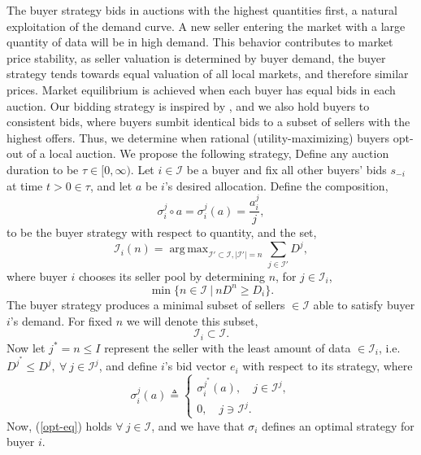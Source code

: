 \documentclass[12pt]{article}
\theoremstyle{definition}
\newcommand{\mcI}{\mathcal{I}}
\newcommand{\g}{\sigma}
\DeclareMathOperator*{\argmax}{arg\,max}
\begin{document}
\begin{multicols}{2}
The buyer strategy bids in auctions with the highest quantities first,
a natural exploitation of the demand curve. A new seller entering the market
with a large quantity of data will be in high demand. This behavior contributes to market price
stability, as seller valuation is determined by buyer demand, the
buyer strategy tends towards equal valuation of all local markets, and therefore
similar prices. Market equilibrium is achieved when each buyer has equal bids in
each auction. Our bidding strategy is inspired by \cite{lazar}, and we also
hold buyers to consistent bids, where buyers sumbit identical bids to a
subset of sellers with the highest offers.
Thus, we determine when rational (utility-maximizing) buyers opt-out of a local auction. 
We propose the following strategy, 
{
\label{buyerstrategy}
Define any auction duration to be $\tau \in [0,\infty)$. 
Let $i\in\mcI$ be a buyer and fix all other buyers' bids $s_{-i}$ at time
$t>0\in\tau$, and let $a$ be $i$'s desired allocation. 
Define the composition,
$$
     \g_i^j \circ a = \g_i^j(a) = \frac{a_i^j}{j},
$$
to be the buyer strategy with respect to quantity, and the set,
$$
    \mcI_i(n) =\argmax_{\mcI' \subset \mcI, \vert\mcI'\vert =
n}\sum_{j\in\mcI'} D^j,
$$
where buyer $i$ chooses its seller pool by determining $n$, for $j\in\mcI_i$,
\begin{equation}\label{buyercoordinate}
    \min\big\lbrace n \in \mcI \ \vert \ n D^n\ge D_i\big\rbrace. 
\end{equation} 
The buyer strategy produces a minimal subset of sellers $\in \mcI$ 
able to satisfy buyer $i$'s demand. For 
fixed $n$ we will denote this subset,
\begin{equation}\label{sellers}
    \mcI_i \subset \mcI.
\end{equation}  
Now let $j^* = n \le I$ represent the seller with the least amount of data
$\in\mcI_i$, i.e. $D^{j^*} \le D^j, \ \forall\ j \in\mcI^j$, and define $i$'s bid
vector $e_i$ with respect to its strategy, where
\begin{equation}\label{opt-eq}
    \g_i^j(a) \triangleq \begin{cases} \g_i^{j^*}(a), \quad j\in\mcI^j,\\
            0, \quad j\ni\mcI^j.\end{cases}
\end{equation}
Now, (\ref{opt-eq}) holds $\forall \ j\in\mcI$,
and we have that $\g_i$ defines an optimal strategy for buyer $i$.
}\\

\end{multicols}
\end{document}
